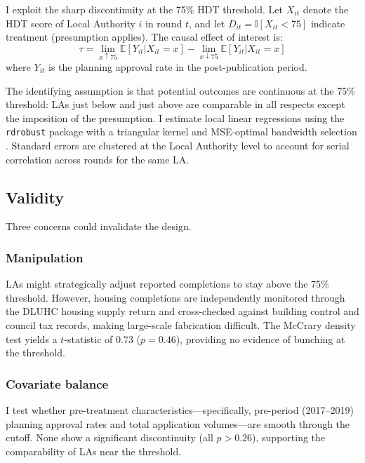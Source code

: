\documentclass[12pt]{article}
\newcommand{\E}{\mathbb{E}}
\newcommand{\ind}{\mathbb{I}}
\begin{document}
I exploit the sharp discontinuity at the 75\% HDT threshold. Let $X_{it}$ denote the HDT score of Local Authority $i$ in round $t$, and let $D_{it} = \ind[X_{it} < 75]$ indicate treatment (presumption applies). The causal effect of interest is:
\begin{equation}
\tau = \lim_{x \uparrow 75} \E[Y_{it} | X_{it} = x] - \lim_{x \downarrow 75} \E[Y_{it} | X_{it} = x]
\end{equation}
where $Y_{it}$ is the planning approval rate in the post-publication period.

The identifying assumption is that potential outcomes are continuous at the 75\% threshold: LAs just below and just above are comparable in all respects except the imposition of the presumption. I estimate local linear regressions using the \texttt{rdrobust} package \citep{calonico2020} with a triangular kernel and MSE-optimal bandwidth selection \citep{cct2014}. Standard errors are clustered at the Local Authority level to account for serial correlation across rounds for the same LA.

\subsection{Validity}

Three concerns could invalidate the design.

\subsubsection*{Manipulation} LAs might strategically adjust reported completions to stay above the 75\% threshold. However, housing completions are independently monitored through the DLUHC housing supply return and cross-checked against building control and council tax records, making large-scale fabrication difficult. The McCrary density test \citep{mccrary2008} yields a $t$-statistic of 0.73 ($p = 0.46$), providing no evidence of bunching at the threshold.

\subsubsection*{Covariate balance} I test whether pre-treatment characteristics---specifically, pre-period (2017--2019) planning approval rates and total application volumes---are smooth through the cutoff. None show a significant discontinuity (all $p > 0.26$), supporting the comparability of LAs near the threshold.
\end{document}
